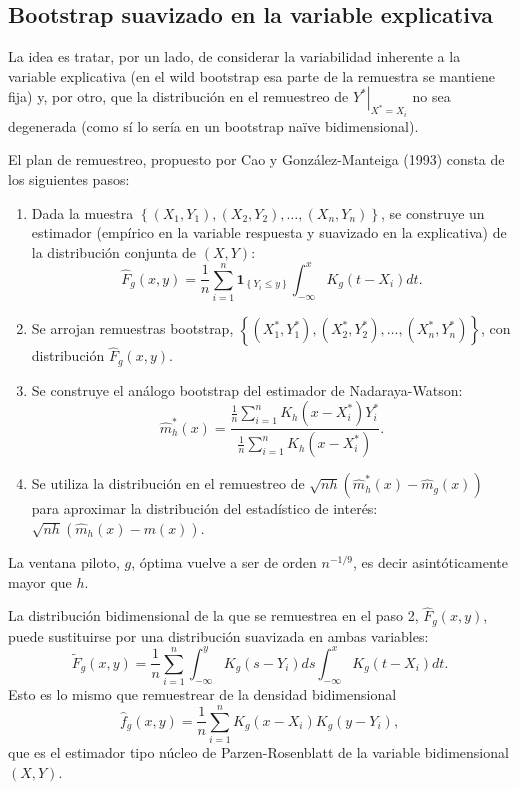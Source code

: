 \documentclass[]{book}
\theoremstyle{definition}
\theoremstyle{definition}
\theoremstyle{definition}
\theoremstyle{remark}
\begin{document}
\subsection{Bootstrap suavizado en la variable
explicativa}\label{bootstrap-suavizado-en-la-variable-explicativa}

La idea es tratar, por un lado, de considerar la variabilidad inherente
a la variable explicativa (en el wild bootstrap esa parte de la
remuestra se mantiene fija) y, por otro, que la distribución en el
remuestreo de \(\left. Y^{\ast}\right\vert _{X^{\ast}=X_i}\) no sea
degenerada (como sí lo sería en un bootstrap naïve bidimensional).

El plan de remuestreo, propuesto por Cao y González-Manteiga (1993)
consta de los siguientes pasos:

\begin{enumerate}
\def\labelenumi{\arabic{enumi}.}
\item
  Dada la muestra
  \(\left\{ \left( X_1,Y_1 \right),\left( X_2,Y_2 \right),\ldots ,\left( X_n,Y_n \right) \right\}\),
  se construye un estimador (empírico en la variable respuesta y
  suavizado en la explicativa) de la distribución conjunta de
  \(\left( X,Y \right)\):
  \[\hat{F}_{g}\left( x,y \right) =\frac{1}{n}\sum_{i=1}^{n}\mathbf{1}_{\left\{
  Y_i\leq y\right\} }\int_{-\infty }^{x}K_{g}\left( t-X_i \right) dt.\]
\item
  Se arrojan remuestras bootstrap,
  \(\left\{ \left( X_1^{\ast },Y_1^{\ast} \right),\left( X_2^{\ast},Y_2^{\ast} \right),\ldots ,\left( X_n^{\ast},Y_n^{\ast} \right) \right\}\),
  con distribución \(\hat{F}_{g}\left( x,y \right)\).
\item
  Se construye el análogo bootstrap del estimador de Nadaraya-Watson:
  \[\hat{m}_{h}^{\ast}\left( x \right) =\frac{\frac{1}{n}\sum_{i=1}^{n}K_{h}
  \left( x-X_i^{\ast} \right) Y_i^{\ast}}{\frac{1}{n}\sum_{i=1}^{n}K_{h}
  \left( x-X_i^{\ast} \right)}.\]
\item
  Se utiliza la distribución en el remuestreo de
  \(\sqrt{nh}\left( \hat{m}_{h}^{\ast}\left( x \right) -\hat{m}_{g}\left( x \right) \right)\)
  para aproximar la distribución del estadístico de interés:
  \(\sqrt{nh}\left( \hat{m}_{h}\left( x \right) -m\left( x \right) \right)\).
\end{enumerate}

La ventana piloto, \(g\), óptima vuelve a ser de orden \(n^{-1/9}\), es
decir asintóticamente mayor que \(h\).

La distribución bidimensional de la que se remuestrea en el paso 2,
\(\hat{F}_{g}\left( x,y \right)\), puede sustituirse por una
distribución suavizada en ambas variables:
\[\tilde{F}_{g}\left( x,y \right) =\frac{1}{n}\sum_{i=1}^{n}
\int_{-\infty}^{y}K_{g}\left( s-Y_i \right) ds \int_{-\infty }^{x}
K_{g}\left( t-X_i \right) dt.\] Esto es lo mismo que remuestrear de la
densidad bidimensional
\[\hat{f}_{g}\left( x,y \right) = \frac{1}{n}\sum_{i=1}^{n}
K_{g}\left( x-X_i \right) K_{g}\left( y-Y_i \right),\] que es el
estimador tipo núcleo de Parzen-Rosenblatt de la variable bidimensional
\(\left( X,Y \right)\).
\end{document}
